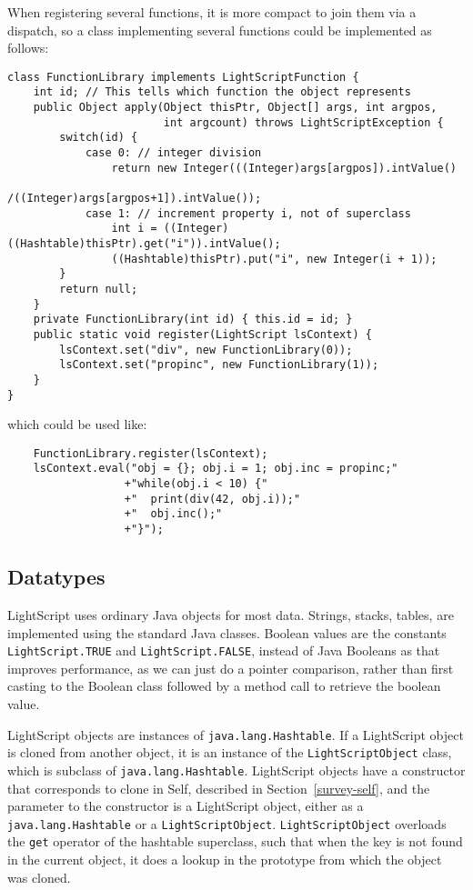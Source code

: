 \documentclass[11pt]{report}
\begin{document}
When registering several functions, it is more compact to join them via a dispatch, 
so a class implementing several functions could be implemented as follows:
\begin{lstlisting}
class FunctionLibrary implements LightScriptFunction {
    int id; // This tells which function the object represents
    public Object apply(Object thisPtr, Object[] args, int argpos, 
                        int argcount) throws LightScriptException {
        switch(id) {
            case 0: // integer division
                return new Integer(((Integer)args[argpos]).intValue()
                                  /((Integer)args[argpos+1]).intValue());
            case 1: // increment property i, not of superclass
                int i = ((Integer)((Hashtable)thisPtr).get("i")).intValue();
                ((Hashtable)thisPtr).put("i", new Integer(i + 1));
        }
        return null;
    }
    private FunctionLibrary(int id) { this.id = id; }
    public static void register(LightScript lsContext) {
        lsContext.set("div", new FunctionLibrary(0));
        lsContext.set("propinc", new FunctionLibrary(1));
    }
}
\end{lstlisting}
which could be used like:
\begin{lstlisting}
    FunctionLibrary.register(lsContext);
    lsContext.eval("obj = {}; obj.i = 1; obj.inc = propinc;"
                  +"while(obj.i < 10) {"
                  +"  print(div(42, obj.i));"
                  +"  obj.inc();"
                  +"}");
\end{lstlisting}

\subsection{Datatypes}
LightScript uses ordinary Java objects for most data.
Strings, stacks, tables, are implemented using the standard Java classes.
Boolean values are the constants \verb|LightScript.TRUE| and \verb|LightScript.FALSE|, instead of Java Booleans as that improves performance, as we can just do a pointer comparison, rather than first casting to the Boolean class followed by a method call to retrieve the boolean value.

LightScript objects are instances of \verb|java.lang.Hashtable|. If a LightScript object is cloned from another object, it is an instance of the \verb|LightScriptObject| class, which is subclass of \verb|java.lang.Hashtable|. LightScript objects have a constructor that corresponds to clone in Self, described in Section~\ref{survey-self}, and the parameter to the constructor is a LightScript object, either as a \verb|java.lang.Hashtable| or a \verb|LightScriptObject|. \verb|LightScriptObject| overloads the \verb|get| operator of the hashtable superclass, such that when the key is not found in the current object, it does a lookup in the prototype from which the object was cloned.
\end{document}
